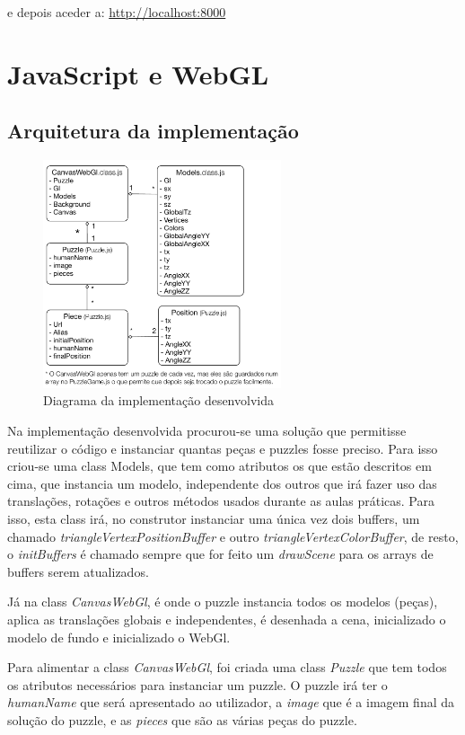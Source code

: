 \documentclass[pdftex,12pt,a4paper]{report}
\begin{document}
e depois aceder a: \url{http://localhost:8000}

\section{JavaScript e WebGL}

\subsection{Arquitetura da implementação}

\begin{figure}[!htb]
\center
 \includegraphics[width=70mm,scale=1]{classes.pdf}
 \caption{Diagrama da implementação desenvolvida}
 \label{fig:decifra_livro}
\end{figure}

Na implementação desenvolvida procurou-se uma solução que permitisse reutilizar o código e instanciar quantas peças e puzzles fosse preciso. Para isso criou-se uma class Models, que tem como atributos os que estão descritos em cima, que instancia um modelo, independente dos outros que irá fazer uso das translações, rotações e outros métodos usados durante as aulas práticas. Para isso, esta class irá, no construtor instanciar uma única vez dois buffers, um chamado \textit{triangleVertexPositionBuffer} e outro  \textit{triangleVertexColorBuffer}, de resto, o \textit{initBuffers} é chamado sempre que for feito um \textit{drawScene} para os arrays de buffers serem atualizados.

Já na class \textit{CanvasWebGl}, é onde o puzzle instancia todos os modelos (peças), aplica as translações globais e independentes, é desenhada a cena, inicializado o modelo de fundo e inicializado o WebGl. 

Para alimentar a class \textit{CanvasWebGl}, foi criada uma class \textit{Puzzle} que tem todos os atributos necessários para instanciar um puzzle. O puzzle irá ter o \textit{humanName} que será apresentado ao utilizador, a \textit{image} que é a imagem final da solução do puzzle, e as \textit{pieces} que são as várias peças do puzzle.
\end{document}
